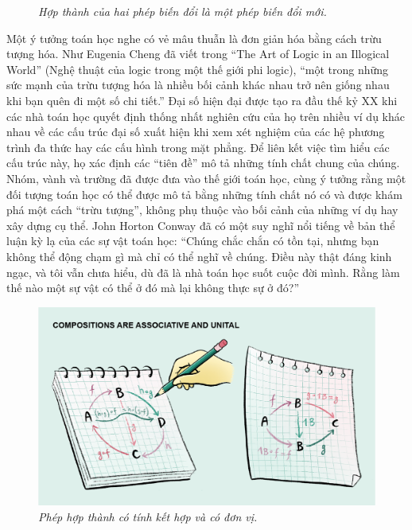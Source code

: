\begin{multicols}{2}
\begin{figure}[H]
		\caption{\small\textit{\color{duongvaotoanhoc}Hợp thành của hai phép biến đổi là một phép biến đổi mới.}}
		\vspace*{-10pt}
	\end{figure}
	Một ý tưởng toán học nghe có vẻ mâu thuẫn là đơn giản hóa bằng cách trừu tượng hóa. Như Eugenia Cheng đã viết trong ``The Art of Logic in an Illogical World'' (Nghệ thuật của logic trong một thế giới phi logic), ``một trong những sức mạnh của trừu tượng hóa là nhiều bối cảnh khác nhau trở nên giống nhau khi bạn quên đi một số chi tiết.'' Đại số hiện đại được tạo ra đầu thế kỷ XX khi các nhà toán học quyết định thống nhất nghiên cứu của họ trên nhiều ví dụ khác nhau về các cấu trúc đại số xuất hiện khi xem xét nghiệm của các hệ phương trình đa thức hay các cấu hình trong mặt phẳng. Để liên kết việc tìm hiểu các cấu trúc này, họ xác định các ``tiên đề'' mô tả những tính chất chung của chúng. Nhóm, vành và trường đã được đưa vào thế giới toán học, cùng ý tưởng rằng một đối tượng toán học có thể được mô tả bằng những tính chất nó có và được khám phá một cách ``trừu tượng'', không phụ thuộc vào bối cảnh của những ví dụ hay xây dựng cụ thể.
	\vskip 0.1cm
	John Horton Conway đã có một suy nghĩ nổi tiếng về bản thể luận kỳ lạ của các sự vật toán học: ``Chúng chắc chắn có tồn tại, nhưng bạn không thể động chạm gì mà chỉ có thể nghĩ về chúng. Điều này thật đáng kinh ngạc, và tôi vẫn chưa hiểu, dù đã là nhà toán học suốt cuộc đời mình. Rằng làm thế nào một sự vật có thể ở đó mà lại không thực sự ở đó?''
	\begin{figure}[H]
		\centering
		\vspace*{-5pt}
		\captionsetup{labelformat= empty, justification=centering}
		\includegraphics[width=1\linewidth]{4}
		\caption{\small\textit{\color{duongvaotoanhoc}Phép hợp thành có tính kết hợp và có đơn vị.}}

\end{figure}
\end{multicols}

